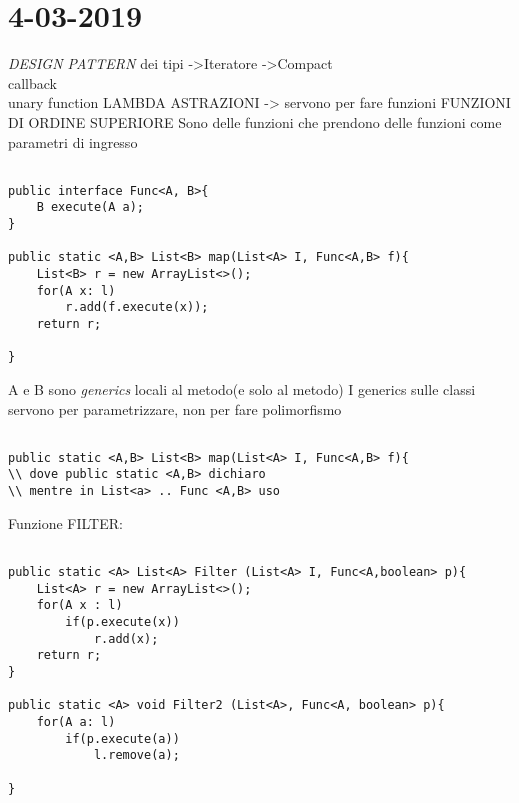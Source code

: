 

\newpage
\section{4-03-2019}
\par

\textit{DESIGN PATTERN} dei tipi \newline
->Iteratore \newline
->Compact\\callback\\unary function \newline
LAMBDA ASTRAZIONI -> servono per fare funzioni \newline	
FUNZIONI DI ORDINE SUPERIORE \newline
Sono delle funzioni che prendono delle funzioni come parametri di ingresso 


\begin{lstlisting}[basicstyle=\small,]

public interface Func<A, B>{
	B execute(A a);
}

public static <A,B> List<B> map(List<A> I, Func<A,B> f){
	List<B> r = new ArrayList<>();
	for(A x: l)
		r.add(f.execute(x));
	return r;

}

\end{lstlisting}

A e B sono \textit{generics} locali al metodo(e solo al metodo) \newline
I generics sulle classi servono per parametrizzare, non per fare polimorfismo \newline


\begin{lstlisting}[basicstyle=\small,]

public static <A,B> List<B> map(List<A> I, Func<A,B> f){
\\ dove public static <A,B> dichiaro
\\ mentre in List<a> .. Func <A,B> uso

\end{lstlisting}

Funzione FILTER: 
\begin{lstlisting}[basicstyle=\small,]

public static <A> List<A> Filter (List<A> I, Func<A,boolean> p){
	List<A> r = new ArrayList<>();
	for(A x : l)
		if(p.execute(x))
			r.add(x);
	return r;
}

public static <A> void Filter2 (List<A>, Func<A, boolean> p){
	for(A a: l)
		if(p.execute(a))
			l.remove(a);

}

\end{lstlisting}

